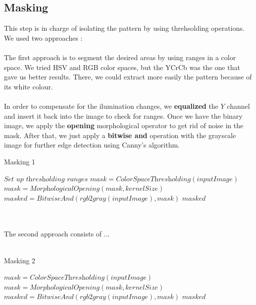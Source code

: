 \documentclass[journal]{IEEEtran}
\begin{document}
\subsection{Masking}
This step is in charge of isolating the pattern by using threhsolding operations. We used two approaches :
\\
\\
The first approach is to segment the desired areas by using ranges in a color space. We tried HSV and RGB color spaces, but the YCrCb was the one that gave us better results. There, we could extract more easily the pattern because of its white colour.
\\
\\
In order to compensate for the ilumination changes, we \textbf{equalized} the $Y$ channel and insert it back into the image to check for ranges. Once we have the binary image, we apply the \textbf{opening} morphological operator to get rid of noise in the mask. After that, we just apply a \textbf{bitwise and} operation with the grayscale image for further edge detection using Canny's algorithm.
\begin{algorithm}
\caption{Masking 1}
\begin{algorithmic}[1]
\State $\textit{Set up thresholding ranges}$
\State $mask   = \textit{ColorSpaceThresholding}(inputImage)$
\State $mask   = \textit{MorphologicalOpening}(mask, kernelSize)$
\State $masked = \textit{BitwiseAnd}( \textit{rgb2gray}( inputImage ), mask )$
\Return $masked$
\end{algorithmic}
\end{algorithm}
\\
\\
The second approach consists of ...
\\
\\
\begin{algorithm}
\caption{Masking 2}
\begin{algorithmic}[1]
\State $mask   = \textit{ColorSpaceThresholding}(inputImage)$
\State $mask   = \textit{MorphologicalOpening}(mask, kernelSize)$
\State $masked = \textit{BitwiseAnd}( \textit{rgb2gray}( inputImage ), mask )$
\Return $masked$
\end{algorithmic}
\end{algorithm}
\end{document}
